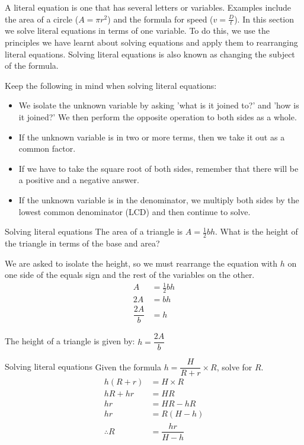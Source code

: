 A literal equation is one that has several letters or variables. Examples include the area of a circle ($A=\pi{r}^{2}$) and the formula for speed ($v=\frac{D}{t}$). In this section we solve literal equations in terms of one variable. To do this, we use the principles we have learnt about solving equations and apply them to rearranging literal equations. Solving literal equations is also known as changing the subject of the formula.
 
Keep the following in mind when solving literal equations:
\begin{itemize}
\item We isolate the unknown variable by asking 'what is it joined to?' and 'how is it joined?' We then perform the opposite operation to both sides as a whole.
\item If the unknown variable is in two or more terms, then we take it out as a common factor. 
\item  If we have to take the square root of both sides, remember that there will be a positive and a negative answer.
\item  If the unknown variable is in the denominator, we multiply both sides by the lowest common denominator (LCD) and then continue to solve.
\end{itemize}

\begin{wex}
{Solving literal equations}
{The area of a triangle is $A=\frac{1}{2}bh$. What is the height of the triangle in terms of the base and area?}
{
We are asked to isolate the height, so we must rearrange the equation with $h$ on one side of the equals sign and the rest of the variables on the other.
\begin{align*}
  A &= \frac{1}{2}bh \\
  2A &= bh \\
  \dfrac{2A}{b} &= h
\end{align*}

The height of a triangle is given by: $h=\dfrac{2A}{b}$
} 
\end{wex}

\begin{wex}
{Solving literal equations}
{Given the formula $h=\dfrac{H}{R+r} \times R$, solve for $R$.}
{
\begin{align*}
  h(R+r) &= H \times R \\
  hR + hr &= HR \\
  hr &= HR - hR \\
  hr &= R(H - h) \\
  \therefore R &= \dfrac{hr}{H-h}
\end{align*}
} 
\end{wex}


